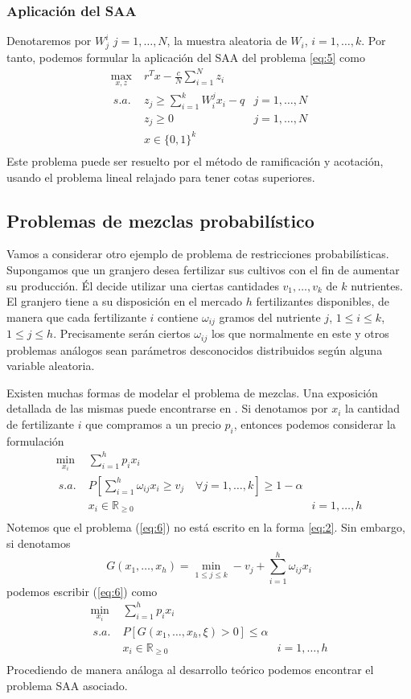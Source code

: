 \documentclass[twoside,a4paper,openright,12pt]{book}
\newcommand{\R}{\mathbb{R}}
\begin{document}
\subsubsection*{Aplicación del SAA}
Denotaremos por $W^i_j$ $j=1,\dotsc,N$, la muestra aleatoria de $W_i$, $i=1,\dotsc,k$. Por tanto, podemos formular la aplicación del SAA del problema \ref{eq:5} como
\begin{align*}	
\max_{x,z}&\; r^Tx  -\frac{c}{N}\sum_{i=1}^N z_i \\\
s.a.
& \; z_j \geq \sum_{i=1}^kW_i^jx_i - q  & j=1,\dotsc,N\\ 
&\; z_j\geq 0 &j=1,\dotsc,N  \\
& \; x\in\{0,1\}^k\\
\end{align*}
Este problema puede ser resuelto por el método de ramificación y acotación, usando el problema lineal relajado para tener cotas superiores.
\subsection{Problemas de mezclas probabilístico}
Vamos a considerar otro ejemplo de problema de restricciones probabilísticas. Supongamos que un granjero desea fertilizar sus cultivos con el fin de aumentar su producción. Él decide utilizar una ciertas cantidades $v_1,\dotsc,v_k$ de $k$ nutrientes. El granjero tiene a su disposición en el mercado $h$ fertilizantes disponibles, de manera que cada fertilizante $i$ contiene $\omega_{ij}$ gramos del nutriente $j$, $1\leq i \leq k$, $1 \leq j \leq h$. Precisamente serán ciertos $\omega_{ij}$ los que normalmente en este y otros problemas análogos sean parámetros desconocidos distribuidos según alguna variable aleatoria.

Existen muchas formas de modelar el problema de mezclas. Una exposición detallada de las mismas puede encontrarse en \cite{mixing}. Si denotamos por $x_i$ la cantidad de fertilizante $i$ que compramos a un precio $p_i$, entonces podemos considerar la formulación
\begin{align*}	
\min_{x_i} &\; \sum_{i=1}^h p_ix_i 
\\\
s.a.
& \; P\left[\sum_{i=1}^h \omega_{ij}x_i \geq v_j \quad \forall j=1,\dotsc,k\right]\geq 1-\alpha &\tag{6}\label{eq:6}\\
& \; x_i\in\R_{\geq 0} & i=1,\dotsc,h\\
\end{align*}
Notemos que el problema (\ref{eq:6}) no está escrito en la forma \ref{eq:2}. Sin embargo, si denotamos 
$$
G(x_1,\dotsc,x_h)=\min_{1\leq j \leq k}-v_j + \sum_{i=1}^h \omega_{ij}x_i
$$
podemos escribir (\ref{eq:6}) como 
\begin{align*}	
\min_{x_i} &\; \sum_{i=1}^h p_ix_i 
\\\
s.a.
& \; P[G(x_1,\dotsc,x_h,\xi)>0]\leq \alpha\\
& \; x_i\in\R_{\geq 0} & i=1,\dotsc,h\\
\end{align*}
Procediendo de manera análoga al desarrollo teórico podemos encontrar el problema SAA asociado.
\end{document}
